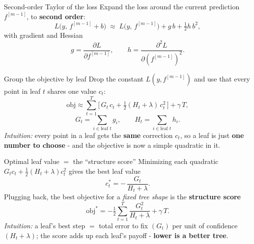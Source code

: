 \documentclass[aspectratio=169]{beamer}
\begin{document}
\begin{frame}{Second-order Taylor of the loss}
  Expand the loss around the current prediction $f^{[m-1]}$, to \textbf{second order}:
  \[
    L\big(y,\, f^{[m-1]} + b\big) \;\approx\;
    L\big(y,\, f^{[m-1]}\big) + g\, b + \tfrac12 h\, b^2,
  \]
  with gradient and Hessian
  \[
    g = \frac{\partial L}{\partial f^{[m-1]}}, \qquad
    h = \frac{\partial^2 L}{\partial (f^{[m-1]})^2}.
  \]
\end{frame}

\begin{frame}{Group the objective by leaf}
  Drop the constant $L(y,f^{[m-1]})$ and use that every point in leaf $t$ shares one value $c_t$:
  \[
    \mathrm{obj} \approx \sum_{t=1}^{T}\Big[\, G_t\, c_t + \tfrac12 (H_t + \lambda)\, c_t^2 \,\Big] + \gamma\,T,
  \]
  \[
    G_t = \!\!\sum_{i \in \text{leaf } t}\!\! g_i, \qquad H_t = \!\!\sum_{i \in \text{leaf } t}\!\! h_i .
  \]
  \vfill
  \emph{Intuition:} every point in a leaf gets the \textbf{same} correction $c_t$, so a leaf is
  just \textbf{one number to choose} - and the objective is now a simple quadratic in it.
\end{frame}

\begin{frame}{Optimal leaf value $=$ the ``structure score''}
  Minimizing each quadratic $G_t c_t + \tfrac12(H_t+\lambda)c_t^2$ gives the best leaf value
  \[
    c_t^{*} = -\,\frac{G_t}{H_t + \lambda}.
  \]
  Plugging back, the best objective for a \emph{fixed tree shape} is the \textbf{structure score}
  \[
    \mathrm{obj}^{*} = -\tfrac12 \sum_{t=1}^{T} \frac{G_t^2}{H_t + \lambda} + \gamma\,T .
  \]
  {\footnotesize \emph{Intuition:} a leaf's best step $=$ total error to fix $(G_t)$ per unit of
  confidence $(H_t{+}\lambda)$; the score adds up each leaf's payoff - \textbf{lower is a better tree}.}
  \vskip 3pt
\end{frame}
\end{document}
